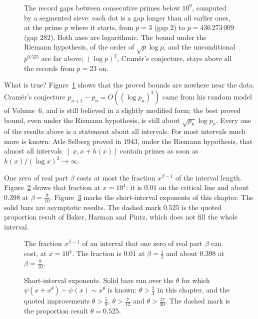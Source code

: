 \begin{figure}[ht]
\centering
{}
\caption{The record gaps between consecutive primes below $10^9$, computed by a segmented sieve: each dot is a gap longer than all earlier ones, at the prime $p$ where it starts, from $p=3$ (gap $2$) to $p=436\,273\,009$ (gap $282$). Both axes are logarithmic. The bound under the Riemann
hypothesis, of the order of $\sqrt p\log p$, and the unconditional $p^{0.525}$ are far above; $(\log p)^2$, Cram\'er's conjecture, stays above all the records from $p=23$ on.}
\label{fig:gaps}
\end{figure}

What is true? Figure~\ref{fig:gaps} shows that the proved bounds are nowhere near the data. Cram\'er's conjecture $p_{n+1}-p_n=O((\log p_n)^2)$ came from his random model of Volume~6, and is still believed in a slightly modified form; the best proved bound, even under the Riemann hypothesis, is still about $\sqrt{p_n}\log p_n$. Every
one of the results above is a statement about all intervals. For most intervals much more is known: Atle Selberg proved in 1943, under the Riemann hypothesis, that almost all intervals $\left]x,x+h(x)\right]$ contain primes as soon as $h(x)/(\log x)^2\to\infty$.

One zero of real part $\beta$ costs at most the fraction $x^{\beta-1}$ of the interval length. Figure~\ref{fig:v14-extra-01-a} draws that fraction at $x=10^4$: it is $0.01$ on the critical line and about $0.398$ at $\beta=\frac9{10}$. Figure~\ref{fig:v14-extra-01-b} marks the short-interval exponents of this chapter. The solid bars are asymptotic results. The dashed mark $0.525$ is the quoted proportion result of Baker, Harman and Pintz, which does not fill the whole interval.

\begin{figure}[ht]
\centering
{}
\caption{The fraction $x^{\beta-1}$ of an interval that one zero of real part $\beta$ can cost, at $x=10^4$. The fraction is $0.01$ at $\beta=\frac12$ and about $0.398$ at $\beta=\frac9{10}$.}
\label{fig:v14-extra-01-a}
\end{figure}

\begin{figure}[ht]
\centering
{}
\caption{Short-interval exponents. Solid bars run over the $\theta$ for which $\psi(x+x^\theta)-\psi(x)\sim x^\theta$ is known: $\theta>\frac34$ in this chapter, and the quoted improvements $\theta>\frac58$, $\theta>\frac7{12}$ and $\theta>\frac{17}{30}$. The dashed mark is the proportion result $\theta=0.525$.}
\label{fig:v14-extra-01-b}
\end{figure}

